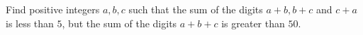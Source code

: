 Find positive integers $a,b,c$ such that the sum of the digits $a+b,b+c$ and $c+a$ is less than $5$,
but the sum of the digits $a+b+c$ is greater than $50$.